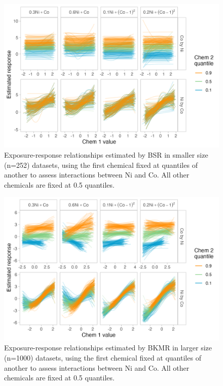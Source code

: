 \documentclass[12pt, twoside]{amherstthesis}
\begin{document}
\begin{figure}

{\centering \includegraphics[width=0.8\linewidth]{figures/ch4_ssm_biv_expresp_3} 

}

\caption{Exposure-response relationships estimated by BSR in smaller size (n=252) datasets, using the first chemical fixed at quantiles of another to assess interactions between Ni and Co. All other chemicals are fixed at 0.5 quantiles.}\label{fig:ssmnico}
\end{figure}
\begin{figure}

{\centering \includegraphics[width=0.8\linewidth]{figures/ch4_klg_biv_expresp_3} 

}

\caption{Exposure-response relationships estimated by BKMR in larger size (n=1000) datasets, using the first chemical fixed at quantiles of another to assess interactions between Ni and Co. All other chemicals are fixed at 0.5 quantiles.}\label{fig:klgnico}
\end{figure}
\end{document}
